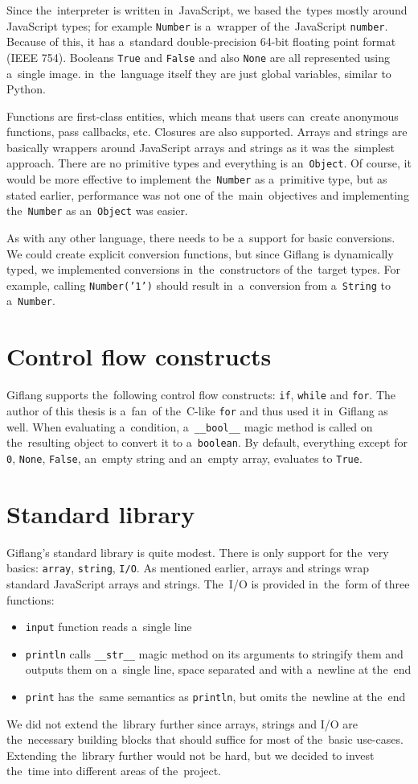 Since the~interpreter is written in~JavaScript, we based the~types mostly around JavaScript types; for example \texttt{Number} is a~wrapper of the~JavaScript
\texttt{number}. Because of this, it has a~standard double-precision 64-bit floating point format (IEEE 754). Booleans \texttt{True} and \texttt{False}
and also \texttt{None} are all represented using a~single image. in~the~language itself they are just global variables, similar to Python.

Functions are first-class entities, which means that users can~create anonymous functions, pass callbacks, etc. Closures are also supported.
Arrays and strings are basically wrappers around JavaScript arrays and strings as it was the~simplest approach. There are no primitive types and everything is
an~\texttt{Object}. Of course, it would be more effective to implement the~\texttt{Number} as a~primitive type, but as stated earlier, performance was not one
of the~main~objectives and implementing the~\texttt{Number} as an~\texttt{Object} was easier.

As with any other language, there needs to be a~support for basic conversions. We could create explicit conversion functions, but since Giflang is dynamically typed,
we implemented conversions in~the~constructors of the~target types. For example, calling \texttt{Number('1')} should result in~a~conversion from a~\texttt{String} to
a~\texttt{Number}.

\section{Control flow constructs}
Giflang supports the~following control flow constructs: \texttt{if}, \texttt{while} and \texttt{for}. The author of this thesis is a~fan~of the~C-like \texttt{for}
and thus used it in~Giflang as well. When evaluating a~condition, a~\texttt{\_\_bool\_\_} magic method is called on the~resulting object to convert it to
a~\texttt{boolean}. By default, everything except for \texttt{0}, \texttt{None}, \texttt{False}, an~empty string and an~empty array, evaluates to \texttt{True}.

\section{Standard library}
Giflang's standard library is quite modest. There is only support for the~very basics: \texttt{array}, \texttt{string}, \texttt{I/O}. As mentioned earlier, arrays
and strings wrap standard JavaScript arrays and strings. The~I/O is provided in~the~form of three functions:
\begin{itemize}
    \item \texttt{input} function reads a~single line
    \item \texttt{println} calls \texttt{\_\_str\_\_} magic method on its arguments to stringify them and outputs them on a~single line, space separated and
    with a~newline at the~end
    \item \texttt{print} has the~same semantics as \texttt{println}, but omits the~newline at the~end
\end{itemize}

We did not extend the~library further since arrays, strings and I/O are the~necessary building blocks that should suffice for most of the~basic use-cases.
Extending the~library further would not be hard, but we decided to invest the~time into different areas of the~project.